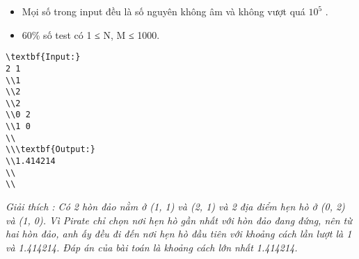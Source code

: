 \begin{itemize}
	\item     Mọi số trong input đều là số nguyên không âm và không vượt quá $10^{5}$    .   
	\item     60\% số test có 1 ≤ N, M ≤ 1000.   
\end{itemize}
\begin{verbatim}
\textbf{Input:}
2 1 
\\1 
\\2
\\2
\\0 2
\\1 0
\\
\\\textbf{Output:}
\\1.414214
\\
\\\end{verbatim}



\emph{     Giải thích        : Có 2 hòn đảo nằm ở (1, 1) và (2, 1) và 2 địa điểm hẹn hò ở (0, 2) và (1, 0). Vì Pirate chỉ chọn nơi hẹn hò gần nhất với hòn đảo đang đứng, nên từ hai hòn đảo, anh ấy đều đi đến nơi hẹn hò đầu tiên với khoảng cách lần lượt là 1 và 1.414214. Đáp án của bài toán là khoảng cách lớn nhất 1.414214.    
\\}
